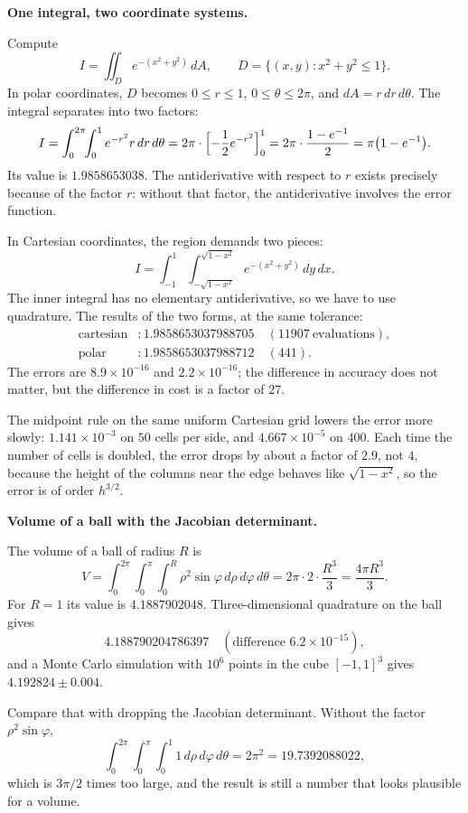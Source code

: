 \textbf{One integral, two coordinate systems.}
\nopagebreak[4]

Compute
\[
I=\iint_{D}e^{-(x^{2}+y^{2})}\,dA,\qquad D=\{(x,y):x^{2}+y^{2}\le1\}.
\]
In polar coordinates, $D$ becomes $0\le r\le1$, $0\le\theta\le2\pi$, and
$dA=r\,dr\,d\theta$. The integral separates into two factors:
\[
I=\int_{0}^{2\pi}\!\!\int_{0}^{1}e^{-r^{2}}r\,dr\,d\theta
=2\pi\cdot\Bigl[-\frac12e^{-r^{2}}\Bigr]_{0}^{1}
=2\pi\cdot\frac{1-e^{-1}}{2}=\pi\bigl(1-e^{-1}\bigr).
\]
Its value is $1.9858653038$. The antiderivative with respect to $r$ exists precisely because of the factor
$r$: without that factor, the antiderivative involves the error function.

In Cartesian coordinates, the region demands two pieces:
\[
I=\int_{-1}^{1}\!\!\int_{-\sqrt{1-x^{2}}}^{\sqrt{1-x^{2}}}
e^{-(x^{2}+y^{2})}\,dy\,dx .
\]
The inner integral has no elementary antiderivative, so we have to use
quadrature. The results of the two forms, at the same tolerance:
\begin{align*}
\text{cartesian}&: 1.9858653037988705 \quad (11907\ \text{evaluations}),\\
\text{polar}&: 1.9858653037988712 \quad (441).
\end{align*}
The errors are $8.9\times10^{-16}$ and $2.2\times10^{-16}$; the difference in accuracy
does not matter, but the difference in cost is a factor of $27$.

The midpoint rule on the same uniform Cartesian grid lowers the error more
slowly: $1.141\times10^{-3}$ on $50$ cells per side, and
$4.667\times10^{-5}$ on $400$. Each time the number of cells is doubled, the error
drops by about a factor of $2.9$, not $4$, because the height of the columns near the edge
behaves like $\sqrt{1-x^{2}}$, so the error is of order $h^{3/2}$.

\textbf{Volume of a ball with the Jacobian determinant.}

The volume of a ball of radius $R$ is
\[
V=\int_{0}^{2\pi}\!\!\int_{0}^{\pi}\!\!\int_{0}^{R}
\rho^{2}\sin\varphi\,d\rho\,d\varphi\,d\theta
=2\pi\cdot2\cdot\frac{R^{3}}{3}=\frac{4\pi R^{3}}{3}.
\]
For $R=1$ its value is $4.1887902048$. Three-dimensional quadrature on the ball gives
\[
4.188790204786397 \quad(\text{difference }6.2\times10^{-15}),
\]
and a Monte Carlo simulation with $10^{6}$ points in the cube $[-1,1]^{3}$ gives
$4.192824\pm0.004$.

Compare that with dropping the Jacobian determinant. Without the factor
$\rho^{2}\sin\varphi$,
\[
\int_{0}^{2\pi}\!\!\int_{0}^{\pi}\!\!\int_{0}^{1}1\,d\rho\,d\varphi\,d\theta
=2\pi^{2}=19.7392088022,
\]
which is $3\pi/2$ times too large, and the result is still a number that looks
plausible for a volume.



